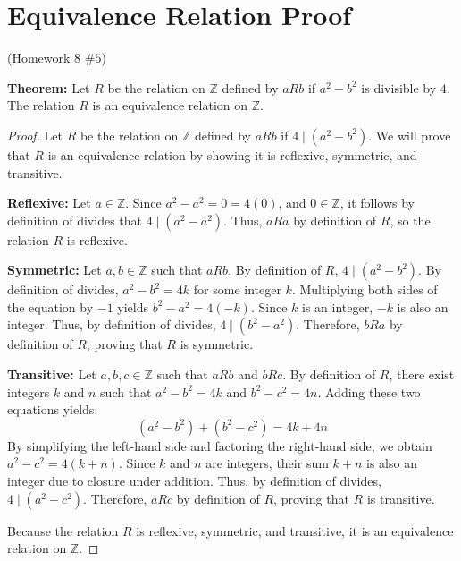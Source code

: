 \documentclass[12pt]{amsart}
\begin{document}
\newpage
\section{Equivalence Relation Proof}
\begin{center}(Homework 8 $\#5$)\end{center}

\textbf{Theorem:} Let $R$ be the relation on $\mathbb{Z}$ defined by $aRb$ if $a^2-b^2$ is divisible by $4$. The relation $R$ is an equivalence relation on $\mathbb{Z}$.

\begin{proof} 
Let $R$ be the relation on $\mathbb{Z}$ defined by $aRb$ if $4 \mid (a^2-b^2)$. We will prove that $R$ is an equivalence relation by showing it is reflexive, symmetric, and transitive. 

\medskip
\textbf{Reflexive:} Let $a \in \mathbb{Z}.$ Since $a^2 - a^2 = 0 = 4(0)$, and $0 \in \mathbb{Z}$, it follows by definition of divides that $4 \mid (a^2-a^2)$. Thus, $aRa$ by definition of $R$, so the relation $R$ is reflexive.

\medskip
\textbf{Symmetric:} Let $a,b \in \mathbb{Z}$ such that $aRb$. By definition of $R$, $4 \mid (a^2-b^2)$. By definition of divides, $a^2-b^2=4k$ for some integer $k$. Multiplying both sides of the equation by $-1$ yields $b^2-a^2 = 4(-k)$. Since $k$ is an integer, $-k$ is also an integer. Thus, by definition of divides, $4 \mid (b^2 - a^2)$. Therefore, $bRa$ by definition of $R$, proving that $R$ is symmetric.

\medskip
\textbf{Transitive:} Let $a,b,c \in \mathbb{Z}$ such that $aRb$ and $bRc$. By definition of $R$, there exist integers $k$ and $n$ such that $a^2-b^2=4k$ and $b^2-c^2=4n$. Adding these two equations yields:
\[
    (a^2-b^2) + (b^2-c^2) = 4k + 4n
\]
By simplifying the left-hand side and factoring the right-hand side, we obtain $a^2 - c^2 = 4(k+n)$. Since $k$ and $n$ are integers, their sum $k+n$ is also an integer due to closure under addition. Thus, by definition of divides, $4 \mid (a^2-c^2)$. Therefore, $aRc$ by definition of $R$, proving that $R$ is transitive.

Because the relation $R$ is reflexive, symmetric, and transitive, it is an equivalence relation on $\mathbb{Z}$.
\end{proof}

\newpage
\end{document}
